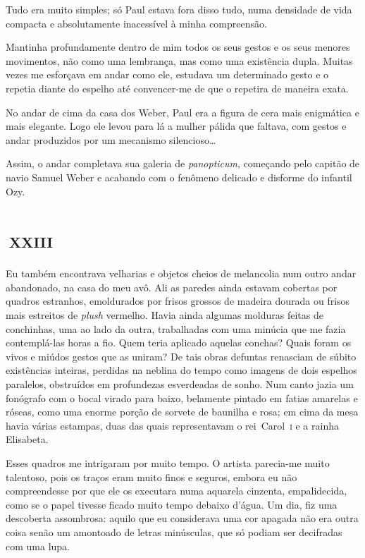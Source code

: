 Tudo era muito simples; só Paul estava fora disso tudo, numa densidade de vida compacta e absolutamente inacessível à minha compreensão.

Mantinha profundamente dentro de mim todos os seus gestos e os seus menores movimentos, não como uma lembrança, mas como uma existência dupla. Muitas vezes me esforçava em andar como ele, estudava um determinado gesto e o repetia diante do espelho até convencer-me de que o repetira de maneira exata.

No andar de cima da casa dos Weber, Paul era a figura de cera mais enigmática e mais elegante. Logo ele levou para lá a mulher pálida que faltava, com gestos e andar produzidos por um mecanismo silencioso\ldots{}

Assim, o andar completava sua galeria de \textit{panopticum}, começando pelo capitão de navio Samuel Weber e acabando com o fenômeno delicado e disforme do infantil Ozy.


\chapter*{\small{}\,\Large\centering\textsc{xxiii}\,\small{}}

Eu também encontrava velharias e objetos cheios de melancolia num outro andar abandonado, na casa do meu avô. Ali as paredes ainda estavam cobertas por quadros estranhos, emoldurados por frisos grossos de madeira dourada ou frisos mais estreitos de \textit{plush} vermelho. Havia ainda algumas molduras feitas de conchinhas, uma ao lado da outra, trabalhadas com uma minúcia que me fazia contemplá-las horas a fio. Quem teria aplicado aquelas conchas? Quais foram os vivos e miúdos gestos que as uniram? De tais obras defuntas renasciam de súbito existências inteiras, perdidas na neblina do tempo como imagens de dois espelhos paralelos, obstruídos em profundezas esverdeadas de sonho.
Num canto jazia um fonógrafo com o bocal virado para baixo, belamente pintado em fatias amarelas e róseas, como uma enorme porção de sorvete de baunilha e rosa; em cima da mesa havia várias estampas, duas das quais representavam o rei~Carol~\textsc{i} e a rainha Elisabeta.

Esses quadros me intrigaram por muito tempo. O artista parecia-me muito talentoso, pois os traços eram muito finos e seguros, embora eu não compreendesse por que ele os executara numa aquarela cinzenta, empalidecida, como se o papel tivesse ficado muito tempo debaixo d'água.
Um dia, fiz uma descoberta assombrosa: aquilo que eu considerava uma cor apagada não era outra coisa senão um amontoado de letras minúsculas, que só podiam ser decifradas com uma lupa.

